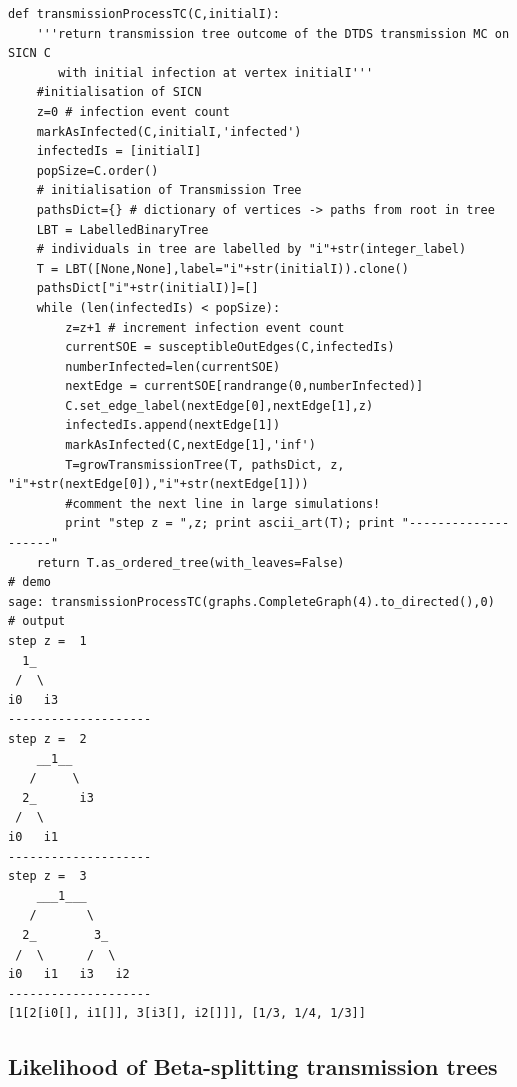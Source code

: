 \documentclass[review]{elsarticle}
\numberwithin{equation}{section}
\begin{document}
{\begin{verbatim}
def transmissionProcessTC(C,initialI):
    '''return transmission tree outcome of the DTDS transmission MC on SICN C 
       with initial infection at vertex initialI'''
    #initialisation of SICN
    z=0 # infection event count
    markAsInfected(C,initialI,'infected')
    infectedIs = [initialI]
    popSize=C.order()
    # initialisation of Transmission Tree
    pathsDict={} # dictionary of vertices -> paths from root in tree
    LBT = LabelledBinaryTree
    # individuals in tree are labelled by "i"+str(integer_label)
    T = LBT([None,None],label="i"+str(initialI)).clone()
    pathsDict["i"+str(initialI)]=[]
    while (len(infectedIs) < popSize):
        z=z+1 # increment infection event count
        currentSOE = susceptibleOutEdges(C,infectedIs)
        numberInfected=len(currentSOE)
        nextEdge = currentSOE[randrange(0,numberInfected)]
        C.set_edge_label(nextEdge[0],nextEdge[1],z)
        infectedIs.append(nextEdge[1])
        markAsInfected(C,nextEdge[1],'inf')
        T=growTransmissionTree(T, pathsDict, z, "i"+str(nextEdge[0]),"i"+str(nextEdge[1]))
        #comment the next line in large simulations!
        print "step z = ",z; print ascii_art(T); print "--------------------"
    return T.as_ordered_tree(with_leaves=False) 
# demo
sage: transmissionProcessTC(graphs.CompleteGraph(4).to_directed(),0)
# output
step z =  1
  1_
 /  \
i0   i3
--------------------
step z =  2
    __1__
   /     \
  2_      i3
 /  \     
i0   i1   
--------------------
step z =  3
    ___1___
   /       \
  2_        3_
 /  \      /  \
i0   i1   i3   i2
--------------------
[1[2[i0[], i1[]], 3[i3[], i2[]]], [1/3, 1/4, 1/3]]
\end{verbatim}
}


\subsection{Likelihood of Beta-splitting transmission trees}\label{Sec:codeC}
\end{document}
